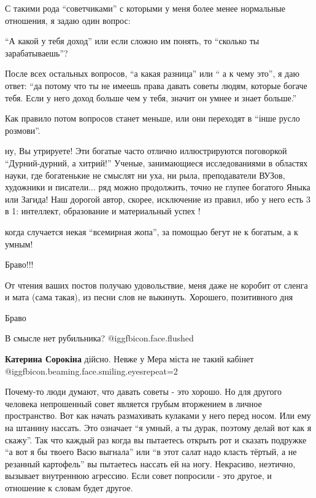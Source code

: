 \begin{itemize}

С такими рода \enquote{советчиками} с которыми у меня более менее нормальные отношения,
я задаю один вопрос:

\enquote{А какой у тебя доход} или если сложно им понять, то \enquote{сколько ты
зарабатываешь}?

После всех остальных вопросов, \enquote{а какая разница} или \enquote{ а к чему это}, я даю
ответ: \enquote{да потому что ты не имеешь права давать советы людям, которые богаче
тебя. Если у него доход больше чем у тебя, значит он умнее и знает больше.}

Как правило потом вопросов станет меньше, или они переходят в \enquote{інше русло
розмови}.

\begin{itemize} %

ну, Вы утрируете! Эти богатые часто отлично иллюстрируются поговоркой
\enquote{Дурний-дурний, а хитрий!} Ученые, занимающиеся исследованиями в областях
науки, где богатенькие не смыслят ни уха, ни рыла, преподаватели ВУЗов, художники
и писатели... ряд можно продолжить, точно не глупее богатого Яныка или Загида!
Наш дорогой автор, скорее, исключение из правил, ибо у него есть 3 в
1: интеллект, образование и материальный успех !


когда случается некая \enquote{всемирная жопа}, за помощью бегут не к богатым,
а к умным!

\end{itemize} %

Браво!!!


От чтения ваших постов получаю удовольствие, меня даже не коробит от сленга и
мата (сама такая), из песни слов не выкинуть. Хорошего, позитивного дня

Браво

В смысле нет рубильника?  @igg{fbicon.face.flushed} 

\begin{itemize} %
\textbf{Катерина Сорокіна} дійсно. Невже у Мера міста не такий кабінет @igg{fbicon.beaming.face.smiling.eyes}{repeat=2} 
\end{itemize} %


Почему-то люди думают, что давать советы - это хорошо. Но для другого человека
непрошенный совет является грубым вторжением в личное пространство. Вот как
начать размахивать кулаками у него перед носом. Или ему на штанину нассать. Это
означает \enquote{я умный, а ты дурак, поэтому делай вот как я скажу}. Так что каждый
раз когда вы пытаетесь открыть рот и сказать подружке \enquote{а вот я бы твоего Васю
выгнала} или \enquote{в этот салат надо класть тёртый, а не резанный картофель} вы
пытаетесь нассать ей на ногу. Некрасиво, неэтично, вызывает внутреннюю
агрессию. Если совет попросили - это другое, и отношение к словам будет другое.


\end{itemize}
